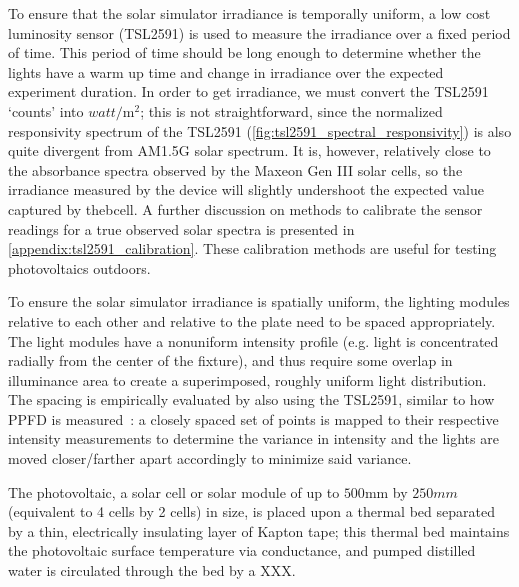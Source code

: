 To ensure that the solar simulator irradiance is temporally uniform, a low
cost luminosity sensor (TSL2591) is used to measure the irradiance over a fixed
period of time. This period of time should be long enough to determine whether
the lights have a warm up time and change in irradiance over the expected
experiment duration. In order to get irradiance, we must convert the TSL2591
`counts' into $\si{watt}/\si{\meter}^2$; this is not straightforward, since
the normalized responsivity spectrum of the TSL2591
(\autoref{fig:tsl2591_spectral_responsivity}) is also quite divergent from
AM1.5G solar spectrum. It is, however, relatively close to the absorbance
spectra observed by the Maxeon Gen III solar cells, so the irradiance measured
by the device will slightly undershoot the expected value captured by thebcell.
A further discussion on methods to calibrate the sensor readings for a true
observed solar spectra is presented in \autoref{appendix:tsl2591_calibration}.
These calibration methods are useful for testing photovoltaics outdoors.

To ensure the solar simulator irradiance is spatially uniform, the lighting
modules relative to each other and relative to the plate need to be spaced
appropriately. The light modules have a nonuniform intensity profile (e.g. light
is concentrated radially from the center of the fixture), and thus require some
overlap in illuminance area to create a superimposed, roughly uniform light
distribution. The spacing is empirically evaluated by also using the TSL2591,
similar to how \acf{PPFD} is measured~\cite{ppfd_measurement}: a closely spaced
set of points is mapped to their respective intensity measurements to
determine the variance in intensity and the lights are moved closer/farther
apart accordingly to minimize said variance.

The photovoltaic, a solar cell or solar module of up to $500 \si{\mm}$ by $250
\si{mm}$ (equivalent to 4 cells by 2 cells) in size, is placed upon a thermal
bed separated by a thin, electrically insulating layer of Kapton tape; this
thermal bed maintains the photovoltaic surface temperature via conductance, and
pumped distilled water is circulated through the bed by a  XXX.

